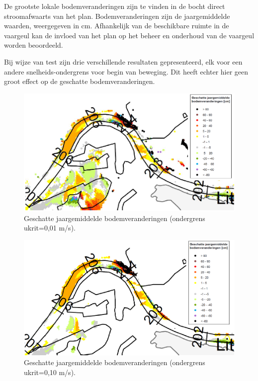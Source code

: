 De grootste lokale bodemveranderingen zijn te vinden in de bocht direct stroomafwaarts van het plan.
Bodemveranderingen zijn de jaargemiddelde waarden, weergegeven in cm.
Afhankelijk van de beschikbare ruimte in de vaargeul kan de invloed van het plan op het beheer en onderhoud van de vaargeul worden beoordeeld.

Bij wijze van test zijn drie verschillende resultaten gepresenteerd, elk voor een andere snelheids-ondergrens voor begin van beweging.
Dit heeft echter hier geen groot effect op de geschatte bodemveranderingen.

\begin{figure}
\includegraphics[width=\columnwidth]{figures/Fig14a.png}
\caption{Geschatte jaargemiddelde bodemveranderingen (ondergrens ukrit=0,01 m/s).}
\label{Fig14a}
\end{figure}

\begin{figure}
\includegraphics[width=\columnwidth]{figures/Fig14b.png}
\caption{Geschatte jaargemiddelde bodemveranderingen (ondergrens ukrit=0,10 m/s).}
\label{Fig14b}
\end{figure}

